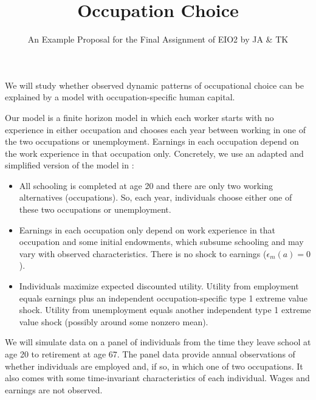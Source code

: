 \documentclass[fleqn,12pt]{article}
\title{Occupation Choice}
\author{An Example Proposal for the Final Assignment of EIO2 by JA \& TK}
\date{}
\begin{document}
\maketitle

We will study whether observed dynamic patterns of occupational choice can be explained by a model with occupation-specific human capital.

Our model is a finite horizon model in which each worker starts with no experience in either occupation and chooses each year between working in one of the two occupations or unemployment. Earnings in each occupation depend on the work experience in that occupation only. Concretely, we use an adapted and simplified version of the model in \citet[][Section I]{jpe97:ecksteinwolpin}:
\begin{itemize}
\item All schooling is completed at age 20 and there are only two working alternatives (occupations). So, each year, individuals choose either one of these two occupations or unemployment.
\item Earnings in each occupation only depend on work experience in that occupation and some initial endowments, which subsume schooling and may vary with observed characteristics. There is no shock to earnings ($\epsilon_m(a)=0$).
\item Individuals maximize expected discounted utility. Utility from employment equals earnings plus an independent occupation-specific type 1 extreme value shock. Utility from unemployment equals another independent type 1 extreme value shock (possibly around some nonzero mean).
\end{itemize}

We will simulate data on a panel of individuals from the time they leave school at age 20 to retirement at age 67. The panel data provide annual observations of whether individuals are employed and, if so, in which one of two occupations. It also comes with some time-invariant characteristics of each individual. Wages and earnings are not observed. 




\end{document}
